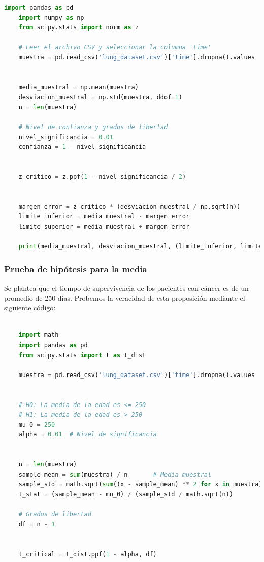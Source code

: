 \documentclass[a4paper,12pt]{article}
\begin{document}
\begin{lstlisting}[language=Python, caption={Código en Python para calcular el intervalo de confianza},label={lst:intervalo_confianza_normal}]
    import pandas as pd
    import numpy as np
    from scipy.stats import norm as z
    
    # Leer el archivo CSV y seleccionar la columna 'time'
    muestra = pd.read_csv('lung_dataset.csv')['time'].dropna().values
    
    
    media_muestral = np.mean(muestra)
    desviacion_muestral = np.std(muestra, ddof=1)
    n = len(muestra)
    
    # Nivel de confianza y grados de libertad
    nivel_significancia = 0.01
    confianza = 1 - nivel_significancia
    

    z_critico = z.ppf(1 - nivel_significancia / 2)
    
    
    margen_error = z_critico * (desviacion_muestral / np.sqrt(n))
    limite_inferior = media_muestral - margen_error
    limite_superior = media_muestral + margen_error
    
    print(media_muestral, desviacion_muestral, (limite_inferior, limite_superior))
    \end{lstlisting}


    \subsubsection*{Prueba de hipótesis para la media}

    Se plantea que el tiempo de supervivencia de los pacientes con cáncer es de un promedio de 250 días. Probemos la veracidad de esta proposición mediante el siguiente código:

    \begin{lstlisting}[language=Python, caption={Código en Python para calcular el estadígrafo de la prueba de hipotesis},label={3st:prueba_hipotesis_time}]
        
    import math
    import pandas as pd
    from scipy.stats import t as t_dist

    muestra = pd.read_csv('lung_dataset.csv')['time'].dropna().values


    # H0: La media de la edad es <= 250
    # H1: La media de la edad es > 250
    mu_0 = 250  
    alpha = 0.01  # Nivel de significancia


    n = len(muestra)                     
    sample_mean = sum(muestra) / n       # Media muestral
    sample_std = math.sqrt(sum((x - sample_mean) ** 2 for x in muestra) / (n - 1))  
    t_stat = (sample_mean - mu_0) / (sample_std / math.sqrt(n))  

    # Grados de libertad
    df = n - 1


    t_critical = t_dist.ppf(1 - alpha, df)  

    \end{lstlisting}
\end{document}
